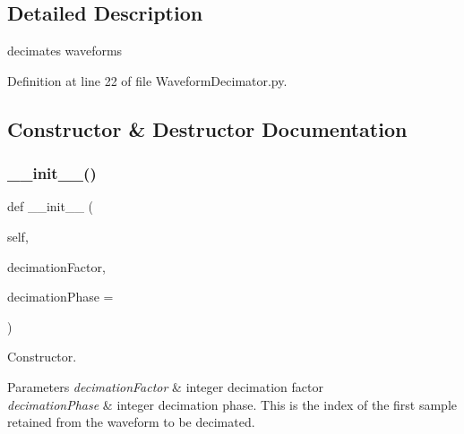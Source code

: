 \subsection{Detailed Description}
decimates waveforms 

Definition at line 22 of file Waveform\+Decimator.\+py.



\subsection{Constructor \& Destructor Documentation}
\mbox{\label{classSignalIntegrity_1_1TimeDomain_1_1Filters_1_1WaveformDecimator_1_1WaveformDecimator_a82d726dbf6a2595a4939e36f886dc24b}} 
\subsubsection{\texorpdfstring{\+\_\+\+\_\+init\+\_\+\+\_\+()}{\_\_init\_\_()}}
{\footnotesize\ttfamily def \+\_\+\+\_\+init\+\_\+\+\_\+ (\begin{DoxyParamCaption}\item[{}]{self,  }\item[{}]{decimation\+Factor,  }\item[{}]{decimation\+Phase = {} }\end{DoxyParamCaption})}



Constructor. 


\begin{DoxyParams}{Parameters}
{\em decimation\+Factor} & integer decimation factor \\
\hline
{\em decimation\+Phase} & integer decimation phase. This is the index of the first sample retained from the waveform to be decimated. \\
\hline
\end{DoxyParams}


